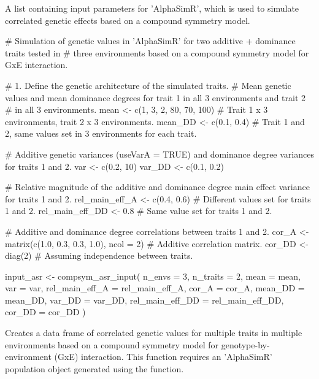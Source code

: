\documentclass[a4paper]{book}
\begin{document}
%
\begin{Value}
A list containing input parameters for 'AlphaSimR', which is used to simulate
correlated genetic effects based on a compound symmetry model.
\end{Value}
%
\begin{Examples}
\begin{ExampleCode}
# Simulation of genetic values in 'AlphaSimR' for two additive + dominance traits tested in
# three environments based on a compound symmetry model for GxE interaction.

# 1. Define the genetic architecture of the simulated traits.
# Mean genetic values and mean dominance degrees for trait 1 in all 3 environments and trait 2
# in all 3 environments.
mean <- c(1, 3, 2, 80, 70, 100) # Trait 1 x 3 environments, trait 2 x 3 environments.
mean_DD <- c(0.1, 0.4) # Trait 1 and 2, same values set in 3 environments for each trait.

# Additive genetic variances (useVarA = TRUE) and dominance degree variances for traits 1 and 2.
var <- c(0.2, 10)
var_DD <- c(0.1, 0.2)

# Relative magnitude of the additive and dominance degree main effect variance for traits 1 and 2.
rel_main_eff_A <- c(0.4, 0.6) # Different values set for traits 1 and 2.
rel_main_eff_DD <- 0.8 # Same value set for traits 1 and 2.

# Additive and dominance degree correlations between traits 1 and 2.
cor_A <- matrix(c(1.0, 0.3, 0.3, 1.0), ncol = 2) # Additive correlation matrix.
cor_DD <- diag(2) # Assuming independence between traits.

input_asr <- compsym_asr_input(
  n_envs = 3,
  n_traits = 2,
  mean = mean,
  var = var,
  rel_main_eff_A = rel_main_eff_A,
  cor_A = cor_A,
  mean_DD = mean_DD,
  var_DD = var_DD,
  rel_main_eff_DD = rel_main_eff_DD,
  cor_DD = cor_DD
)
\end{ExampleCode}
\end{Examples}
%
\begin{Description}\relax
Creates a data frame of correlated genetic values for multiple traits in multiple environments
based on a compound symmetry model for genotype-by-environment (GxE) interaction. This function
requires an 'AlphaSimR' population object generated using the
 function.
\end{Description}
\end{document}
